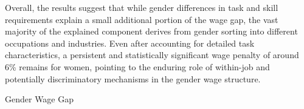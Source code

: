 Overall, the results suggest that while gender differences in task and skill requirements explain a small 
additional portion of the wage gap, the vast majority of the explained component derives from gender sorting 
into different occupations and industries. Even after accounting for detailed task characteristics, a 
persistent and statistically significant wage penalty of around 6\% remains for women, pointing to the 
enduring role of within-job and potentially discriminatory mechanisms in the gender wage structure.

\begin{table}[!t]
    \centering
    \caption{Gender Wage Gap}
    \label{tab:task-wagegap}
\end{table}
